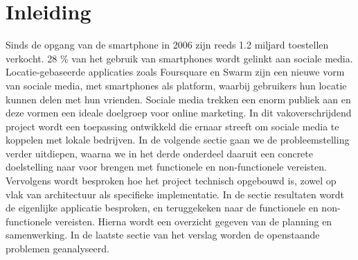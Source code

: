 \chapter{Inleiding}


Sinds de opgang van de smartphone in 2006 zijn reeds 1.2 miljard toestellen verkocht\cite{smartphone_sales}. 28 \% van het gebruik van smartphones wordt gelinkt aan sociale media. Locatie-gebaseerde applicaties zoals Foursquare\cite{foursquare} en Swarm\cite{swarm} zijn een nieuwe vorm van sociale media, met smartphones als platform, waarbij gebruikers hun locatie kunnen delen met hun vrienden.
Sociale media trekken een enorm publiek aan en deze vormen een ideale doelgroep voor online marketing. 
In dit vakoverschrijdend project wordt een toepassing ontwikkeld die ernaar streeft om sociale media te koppelen met lokale bedrijven. 
In de volgende sectie gaan we de probleemstelling verder uitdiepen, waarna we in het derde onderdeel  daaruit een concrete doelstelling naar voor brengen met functionele en non-functionele vereisten. Vervolgens wordt besproken hoe het project technisch opgebouwd is, zowel op vlak van architectuur als specifieke implementatie. In de sectie resultaten wordt de eigenlijke applicatie besproken, en teruggekeken naar de functionele en non-functionele vereisten. Hierna wordt een overzicht gegeven van de planning en samenwerking. In de laatste sectie van het verslag worden de openstaande problemen geanalyseerd.